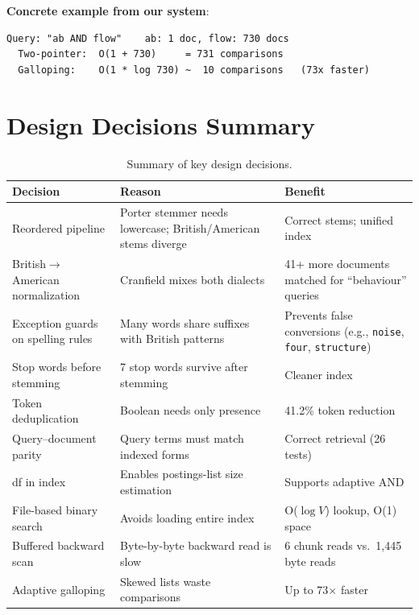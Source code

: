 \documentclass[12pt,a4paper]{article}
\begin{document}
\textbf{Concrete example from our system}:
\begin{lstlisting}[style=outputstyle,numbers=none]
Query: "ab AND flow"    ab: 1 doc, flow: 730 docs
  Two-pointer:  O(1 + 730)     = 731 comparisons
  Galloping:    O(1 * log 730) ~  10 comparisons   (73x faster)
\end{lstlisting}

\section{Design Decisions Summary}
\label{sec:decisions}

\begin{table}[H]
\centering\small
\caption{Summary of key design decisions.}
\label{tab:decisions}
\begin{tabular}{@{}p{3.5cm} p{4cm} p{4.5cm}@{}}
\toprule
\textbf{Decision} & \textbf{Reason} & \textbf{Benefit} \\
\midrule
Reordered pipeline & Porter stemmer needs lowercase; British/American stems diverge & Correct stems; unified index \\
British$\to$American normalization & Cranfield mixes both dialects & 41+ more documents matched for ``behaviour'' queries \\
Exception guards on spelling rules & Many words share suffixes with British patterns & Prevents false conversions (e.g., \texttt{noise}, \texttt{four}, \texttt{structure}) \\
Stop words before stemming & 7 stop words survive after stemming & Cleaner index \\
Token deduplication & Boolean needs only presence & 41.2\% token reduction \\
Query--document parity & Query terms must match indexed forms & Correct retrieval (26 tests) \\
df in index & Enables postings-list size estimation & Supports adaptive AND \\
File-based binary search & Avoids loading entire index & O($\log V$) lookup, O(1) space \\
Buffered backward scan & Byte-by-byte backward read is slow & 6 chunk reads vs.\ 1,445 byte reads \\
Adaptive galloping & Skewed lists waste comparisons & Up to 73$\times$ faster \\
\bottomrule
\end{tabular}
\end{table}
\end{document}

